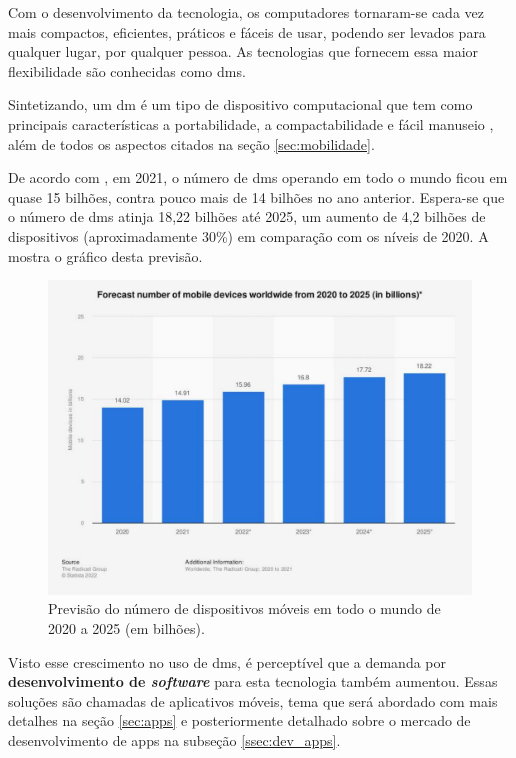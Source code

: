 Com o desenvolvimento da tecnologia, os computadores tornaram-se cada vez mais compactos, eficientes, práticos e fáceis de usar, podendo ser levados para qualquer lugar, por qualquer pessoa. As tecnologias que fornecem essa maior flexibilidade são conhecidas como \acp{dm}.

Sintetizando, um \ac{dm} é um tipo de dispositivo computacional que tem como principais características a portabilidade, a compactabilidade e fácil manuseio \citet{lee2005aplicaccoes}, além de todos os aspectos citados na seção \ref{sec:mobilidade}. 

De acordo com \citet{laricchia_2022}, em 2021, o número de \acp{dm} operando em todo o mundo ficou em quase 15 bilhões, contra pouco mais de 14 bilhões no ano anterior. Espera-se que o número de \acp{dm} atinja 18,22 bilhões até 2025, um aumento de 4,2 bilhões de dispositivos (aproximadamente 30\%) em comparação com os níveis de 2020. A  mostra o gráfico desta previsão.

\begin{figure}[H]
\centering
  \includegraphics[scale=0.35]{images/mobiles20to25.pdf}
  \caption{Previsão do número de dispositivos móveis em todo o mundo de 2020 a 2025 (em bilhões).}
  \label{fig:mobiles20to25}
\end{figure}

Visto esse crescimento no uso de \acp{dm}, é perceptível que a demanda por \textbf{desenvolvimento de \textit{software}} para esta tecnologia também aumentou. Essas soluções são chamadas de aplicativos móveis, tema que será abordado com mais detalhes na seção \ref{sec:apps} e posteriormente detalhado sobre o mercado de desenvolvimento de \acp{app} na subseção \ref{ssec:dev_apps}.

